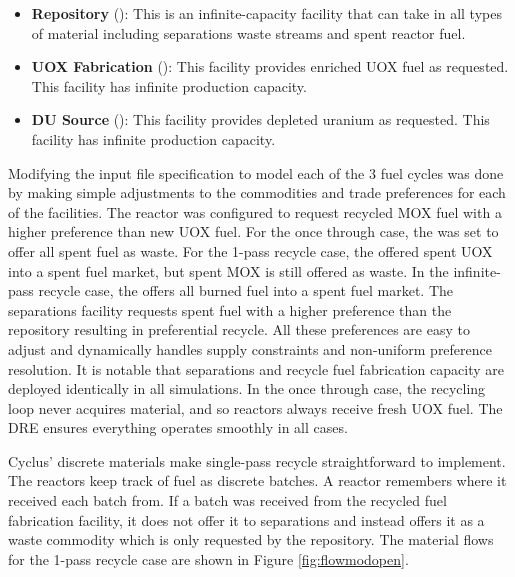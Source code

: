 \begin{itemize}
    \item \textbf{Repository} (): This is an
        infinite-capacity facility that can take in all types of material
        including separations waste streams and spent reactor fuel.

    \item \textbf{UOX Fabrication} (): This facility
        provides enriched \gls{UOX} fuel as requested.  This facility has infinite
        production capacity.

    \item \textbf{DU Source} (): This facility
        provides depleted uranium as requested. This facility has infinite
        production capacity.

\end{itemize}

Modifying the input file specification to model each of the 3 fuel cycles was
done by making simple adjustments to the commodities and trade preferences for
each of the facilities.  The reactor was configured to request recycled \gls{MOX}
fuel with a higher preference than new \gls{UOX} fuel. For the once through case,
the  was set to offer all spent fuel as waste.  For the 1-pass
recycle case, the  offered spent \gls{UOX} into a spent fuel market,
but spent \gls{MOX} is still offered as waste.  In the infinite-pass recycle case,
the  offers all burned fuel into a spent fuel market. The
separations facility requests spent fuel with a higher preference than the
repository resulting in preferential recycle.  All these preferences are easy
to adjust and \Cyclus dynamically handles supply constraints and non-uniform
preference resolution.  It is notable that separations and recycle fuel
fabrication capacity are deployed identically in all simulations.  In the once
through case, the recycling loop never acquires material, and so reactors
always receive fresh \gls{UOX} fuel.  The \gls{DRE} ensures everything operates
smoothly in all cases.

Cyclus' discrete materials make single-pass recycle straightforward to implement.  The
reactors keep track of fuel as discrete batches. A reactor remembers where it
received each batch from.  If a batch was received from the recycled fuel
fabrication facility, it does not offer it to separations and instead offers
it as a waste commodity which is only requested by the repository.  The
material flows for the 1-pass recycle case are shown in Figure
\ref{fig:flowmodopen}.

